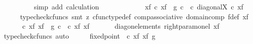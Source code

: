 \begin{isabellebody}
\ \ \ \ \ \ \ \ \isamarkupfalse%
\ {\isacharparenleft}{\kern0pt}simp\ add{\isacharcolon}{\kern0pt}\ calculation{\isacharparenright}{\kern0pt}\isanewline
\ \ \ \ \isamarkupfalse%
\isanewline
\ \ \isamarkupfalse%
\isanewline
\ \ \isamarkupfalse%
\ \isamarkupfalse%
\ {\isachardoublequoteopen}{\isasymphi}\isactrlbsub {\isacharbrackleft}{\kern0pt}{\isacharminus}{\kern0pt}{\isacharcomma}{\kern0pt}x{\isacharunderscore}{\kern0pt}f{\isacharbrackright}{\kern0pt}\isactrlesub \ {\isasymcirc}\isactrlsub c\ x{\isacharunderscore}{\kern0pt}f\ {\isacharequal}{\kern0pt}\ g\ {\isasymcirc}\isactrlsub c\ {\isasymphi}\ {\isasymcirc}\isactrlsub c\ diagonal{\isacharparenleft}{\kern0pt}X{\isacharparenright}{\kern0pt}\ {\isasymcirc}\isactrlsub c\ x{\isacharunderscore}{\kern0pt}f{\isachardoublequoteclose}\isanewline
\ \ \ \ \isamarkupfalse%
\ {\isacharparenleft}{\kern0pt}typecheck{\isacharunderscore}{\kern0pt}cfuncs{\isacharcomma}{\kern0pt}\ smt\ {\isacharparenleft}{\kern0pt}z{}{\isacharparenright}{\kern0pt}\ cfunc{\isacharunderscore}{\kern0pt}type{\isacharunderscore}{\kern0pt}def\ comp{\isacharunderscore}{\kern0pt}associative\ domain{\isacharunderscore}{\kern0pt}comp\ f{\isacharunderscore}{\kern0pt}def\ x{\isacharunderscore}{\kern0pt}f{\isacharparenright}{\kern0pt}\isanewline
\ \ \isamarkupfalse%
\ \isamarkupfalse%
\ {\isachardoublequoteopen}{\isasymphi}\ {\isasymcirc}\isactrlsub c\ {\isasymlangle}x{\isacharunderscore}{\kern0pt}f{\isacharcomma}{\kern0pt}\ x{\isacharunderscore}{\kern0pt}f{\isasymrangle}\ {\isacharequal}{\kern0pt}\ g\ {\isasymcirc}\isactrlsub c\ {\isasymphi}\ {\isasymcirc}\isactrlsub c\ {\isasymlangle}x{\isacharunderscore}{\kern0pt}f{\isacharcomma}{\kern0pt}\ x{\isacharunderscore}{\kern0pt}f{\isasymrangle}{\isachardoublequoteclose}\isanewline
\ \ \ \ \isamarkupfalse%
\ \ diag{\isacharunderscore}{\kern0pt}on{\isacharunderscore}{\kern0pt}elements\ right{\isacharunderscore}{\kern0pt}param{\isacharunderscore}{\kern0pt}on{\isacharunderscore}{\kern0pt}el\ x{\isacharunderscore}{\kern0pt}f\ \isamarkupfalse%
\ {\isacharparenleft}{\kern0pt}typecheck{\isacharunderscore}{\kern0pt}cfuncs{\isacharcomma}{\kern0pt}\ auto{\isacharparenright}{\kern0pt}\isanewline
\ \ \isamarkupfalse%
\ \isamarkupfalse%
\ {\isachardoublequoteopen}fixed{\isacharunderscore}{\kern0pt}point\ {\isacharparenleft}{\kern0pt}{\isasymphi}\ {\isasymcirc}\isactrlsub c\ {\isasymlangle}x{\isacharunderscore}{\kern0pt}f{\isacharcomma}{\kern0pt}\ x{\isacharunderscore}{\kern0pt}f{\isasymrangle}{\isacharparenright}{\kern0pt}\ g{\isachardoublequoteclose}\isanewline

\end{isabellebody}
